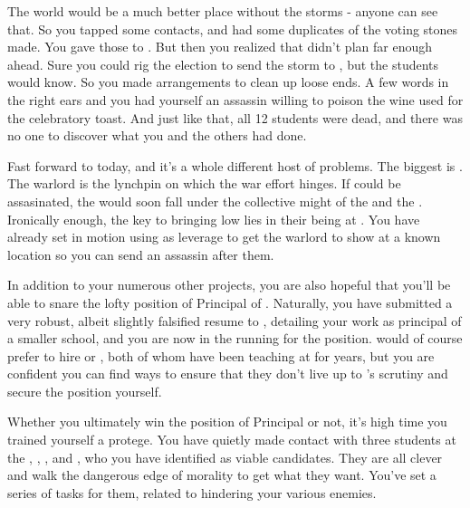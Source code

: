 \documentclass[char]{GL2020}
\begin{document}
The world would be a much better place without the storms - anyone can see that. So you tapped some contacts, and had some duplicates of the voting stones made. You gave those to \cHeadScientist{}. But then you realized that \cDiplomat{} didn’t plan far enough ahead. Sure you could rig the election to send the storm to \pShip{}, but the students would know. So you made arrangements to clean up loose ends. A few words in the right ears and you had yourself an assassin willing to poison the wine used for the celebratory toast. And just like that, all 12 students were dead, and there was no one to discover what you and the others had done.

Fast forward to today, and it's a whole different host of problems. The biggest is \cLoud{\full}. The warlord is the lynchpin on which the \pShip{} war effort hinges. If \cLoud{\they} could be assasinated, the \pShip{} would soon fall under the collective might of the \pFarm{} and the \pTech{}. Ironically enough, the key to bringing \cLoud{} low lies in their \cWarlordDaughter{\child} being at \pSchool{}. You have already set in motion using \cWarlordDaughter{\them} as leverage to get the warlord to show \cLoud{\themself} at a known location so you can send an assassin after them.

In addition to your numerous other projects, you are also hopeful that you’ll be able to snare the lofty position of Principal of \pSchool{}.  Naturally, you have submitted a very robust, albeit slightly falsified resume to \cPrincipal{}, detailing your work as principal of a smaller school, and you are now in the running for the position.  \cPrincipal{} would of course prefer to hire \cMusic{} or \cBeetle{}, both of whom have been teaching at \pSc{} for years, but you are confident you can find ways to ensure that they don’t live up to \cPrincipal{}’s scrutiny and secure the position yourself.

Whether you ultimately win the position of Principal or not, it’s high time you trained yourself a protege. You have quietly made contact with three students at the \pSc{}, \cPirateChild{}, \cLibAssist{}, and \cAmbition{}, who you have identified as viable candidates. They are all clever and walk the dangerous edge of morality to get what they want. You’ve set a series of tasks for them, related to hindering your various enemies.
\end{document}
